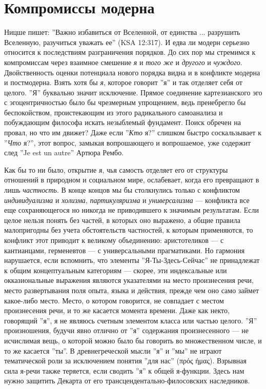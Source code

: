 \documentclass[12pt]{book}
\begin{document}
\section{Компромиссы модерна}

Ницше пишет: ''Важно избавиться от Вселенной, от единства ... разрушить Вселенную, разучиться уважать ее'' (KSA 12:317). И едва ли модерн серьезно относится к последствиям разграничения порядков. До сих пор мы стремимся к компромиссам через взаимное смешение \textit{я} и \textit{того же} и \textit{другого} и \textit{чуждого}. Двойственность оценки потенциала нового порядка видна и в конфликте модерна и постмодерна. Взять хотя бы \textit{я}, которое говорит ''я'' и так отделяет себя от целого. ''Я'' буквально значит исключение. Прямое соединение картезианского эго с эгоцентричностью было бы чрезмерным упрощением, ведь пренебрегло бы беспокойством, проистекающим из этого радикального самоанализа и побуждающим философа искать незыблемый фундамент. Поиск обречен на провал, но что им движет? Даже если ''\textit{Кто} я?'' слишком быстро соскальзывает к ''\textit{Что} я?'', этот вопрос, замыкая вопрошающего и вопрошаемое, уже содержит след ''Je est un autre'' Артюра Рембо.

Как бы то ни было, открытие \textit{я}, чья самость отделяет его от структуры отношений в природном и социальном мире, ослабевает, когда его превращают в лишь \textit{частность}. В конце концов мы бы столкнулись только с конфликтом \textit{индивидуализма} и \textit{холизма}, \textit{партикуляризма} и \textit{универсализма} --- конфликта все еще сохраняющегося но никогда не приводившего к значимым результатам. Если целое нельзя понять без частей, в которых оно выражено, а общие правила малопригодны без учета обстоятельств частностей, к которым применяются, то конфликт этот приводит к великому объединению: аристотеликов --- с кантианцами, герменевтов --- с универсальными прагматиками. Но гармония нарушается, если вспомнить, что элементы ''Я-Ты-Здесь-Сейчас'' не принадлежат к общим концептуальным категориям --- скорее, эти индексальные или окказиональные выражения являются указателями на место произнесения речи, место развертывания поля опыта, языка и действия, прежде чем оно само займет какое-либо место. Место, о котором говорится, не совпадает с местом произнесения речи, и то же касается момента времени. Даже как некто, говорящий ''я'', я не являюсь счетным элементом класса или частью целого. ''Я'' произношения, будучи явно отлично от ''я'' содержания произнесенного --- не исчислимая вещь, о которой можно было бы говорить во множественном числе, и то же касается ''ты''. В древнегреческой мысли ''я'' и ''мы'' не играют тематической роли за исключением понятия ''для нас'' (πρός ήμας). Взрывная сила я-речи также теряется, если сводить ''я'' к общей я-функции. Здесь нам нужно защитить Декарта от его трансцендентально-филосовских наследников.
\end{document}
